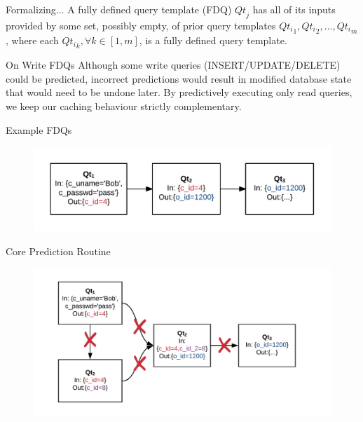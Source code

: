 \documentclass[10pt]{beamer}
\begin{document}
\begin{frame}[fragile]{Formalizing...}
A \alert{fully defined query template} (FDQ) $\mathit{Qt}_j$ has all of its inputs provided
by some set, possibly empty, of prior query templates $\mathit{Qt_i}_1, \mathit{Qt_i}_2, \ldots, \mathit{Qt_i}_m$,
where each $\mathit{Qt_i}_k, \forall k \in [1,m]$, is a fully defined query template.
\end{frame}

\begin{frame}[fragile]{On Write FDQs}
    Although some write queries (INSERT/UPDATE/DELETE) \alert{could} be predicted, incorrect predictions would result
    in modified database state that would need to be undone later.
    By predictively executing only read queries, we keep our caching behaviour \alert{strictly complementary}.
\end{frame}

\begin{frame}[fragile]{Example FDQs}
    \begin{figure}
        \includegraphics[scale=0.22]{apollo_query_pipeline}
    \end{figure}
\end{frame}

\begin{frame}[fragile]{Core Prediction Routine}
    \begin{figure}
        \hspace*{-1cm}
        \includegraphics[scale=0.22]{apollo_cpr}
    \end{figure}
\end{frame}
\end{document}

